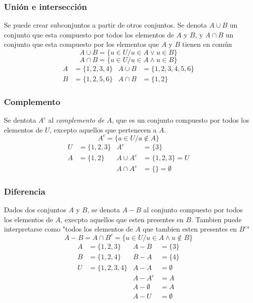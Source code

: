 \documentclass[../teoria.root.tex]{subfiles}
\begin{document}
\subsubsection{Unión e intersección}
Se puede crear subconjuntos a partir de otros conjuntos.
Se denota $A \cup B$ un conjunto que esta compuesto por todos los elementos de $A$ y $B$,
y $A \cap B$ un conjunto que esta compuesto por los elementos que $A$ y $B$ tienen en común
\[ A \cup B = \{ u \in U / u \in A \lor u \in B \} \]
\[ A \cap B = \{ u \in U / u \in A \land u \in B \} \]
\begin{align*}
    A & =  \{ 1, 2, 3, 4 \} & A \cup B & = \{ 1, 2, 3, 4, 5, 6 \} \\
    B & =\{ 1, 2, 5, 6 \}   & A \cap B & = \{ 1, 2 \}
\end{align*}

\subsubsection{Complemento}
Se dentota $A^c$ al \textit{complemento de $A$}, que es un conjunto compuesto por
todos los elementos de $U$, excepto aquellos que pertenecen a $A$.
\[ A^c = \{ a \in U / a \notin A \} \]
\begin{align*}
    U & =  \{1, 2, 3\} & A^c        & = \{3\}            \\
    A & = \{1, 2\}     & A \cup A^c & = \{1, 2, 3\} = U  \\
      &                & A \cap A^c & = \{\} = \emptyset
\end{align*}

\subsubsection{Diferencia}
Dados dos conjuntos $A$ y $B$, se denota $A - B$ al conjunto compuesto por todos
los elementos de $A$, execpto aquellos que esten presentes en $B$. Tambien puede
interpretarse como "todos los elementos de $A$ que tambien esten presentes en $B^c$"
\[ A - B = A \cap B^c = \{ u \in U / u \in A \land u \notin B \} \]
\begin{align*}
    A & = \{1, 2, 3\}    & A - B         & = \{3\}     \\
    B & = \{1, 2, 4\}    & B - A         & = \{4\}     \\
    U & = \{1, 2, 3, 4\} & A - A         & = \emptyset \\
      &                  & A - A^c       & = A         \\
      &                  & A - \emptyset & = A         \\
      &                  & A - U         & = \emptyset
\end{align*}
\end{document}
